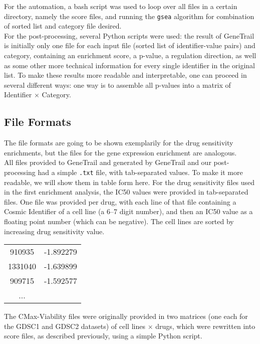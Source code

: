 For the automation, a bash script was used to loop over all files in a certain directory, namely the score files, and running the \lstinline|gsea| algorithm for combination of sorted list and category file desired.\\
For the post-processing, several Python scripts were used: the result of GeneTrail is initially only one file for each input file (sorted list of identifier-value pairs) and category, containing an enrichment score, a p-value, a regulation direction, as well as some other more technical information for every single identifier in the original list. To make these results more readable and interpretable, one can proceed in several different ways: one way is to assemble all p-values into a matrix of Identifier $\times$ Category.

\subsection{File Formats}\label{subsec:td_fileformats}
The file formats are going to be shown exemplarily for the drug sensitivity enrichments, but the files for the gene expression enrichment are analogous.\\
All files provided to GeneTrail and generated by GeneTrail and our post-processing had a simple \lstinline|.txt| file, with tab-separated values. To make it more readable, we will show them in table form here.
For the drug sensitivity files used in the first enrichment analysis, the IC50 values were provided in tab-separated files. One file was provided per drug, with each line of that file containing a Cosmic Identifier of a cell line (a 6--7 digit number), and then an IC50 value as a floating point number (which can be negative). The cell lines are sorted by increasing drug sensitivity value.
\begin{table}[H]
    \begin{tabular}{|cc|}
        \hline
        910935&-1.892279\\
        1331040&-1.639899\\
        909715&-1.592577\\
        ...&\\
        \hline
    \end{tabular}
\end{table}
The CMax-Viability files were originally provided in two matrices (one each for the GDSC1 and GDSC2 datasets) of cell lines $\times$ drugs, which were rewritten into score files, as described previously, using a simple Python script.\\
